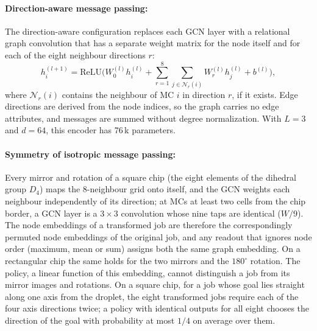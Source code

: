\documentclass[11pt,a4paper]{article}
\begin{document}
\paragraph{Direction-aware message passing:}
The direction-aware configuration replaces each GCN layer with a relational
graph convolution \cite{schlichtkrull2018} that has a separate weight matrix
for the node itself and for each of the eight neighbour directions $r$:
\begin{equation}
  h_i^{(l+1)} = \mathrm{ReLU}\Big(W_0^{(l)} h_i^{(l)} + \sum_{r=1}^{8}\sum_{j\in\mathcal{N}_r(i)} W_r^{(l)} h_j^{(l)} + b^{(l)}\Big),
\end{equation}
where $\mathcal{N}_r(i)$ contains the neighbour of MC $i$ in direction $r$,
if it exists. Edge directions are derived from the node indices, so the graph
carries no edge attributes, and messages are summed without degree
normalization. With $L=3$ and $d=64$, this encoder has 76\,k parameters.

\paragraph{Symmetry of isotropic message passing:}
Every mirror and rotation of a square chip (the eight elements of the dihedral
group $D_4$) maps the 8-neighbour grid onto itself, and the GCN weights each
neighbour independently of its direction; at MCs at least two cells from the
chip border, a GCN layer is a $3\times3$ convolution whose nine taps are
identical ($W/9$). The node embeddings of a
transformed job are therefore the correspondingly permuted node embeddings of
the original job, and any readout that ignores node order (maximum, mean or
sum) assigns both the same graph embedding. On a rectangular chip the same
holds for the two mirrors and the $180^\circ$ rotation. The policy, a linear
function of this embedding, cannot distinguish a job from its mirror images
and rotations. On a square chip, for a job whose goal lies straight along one axis from the
droplet, the eight transformed jobs require each of the four axis directions
twice; a policy with identical outputs for all eight chooses the direction of
the goal with probability at most $1/4$ on average over them.
\end{document}
